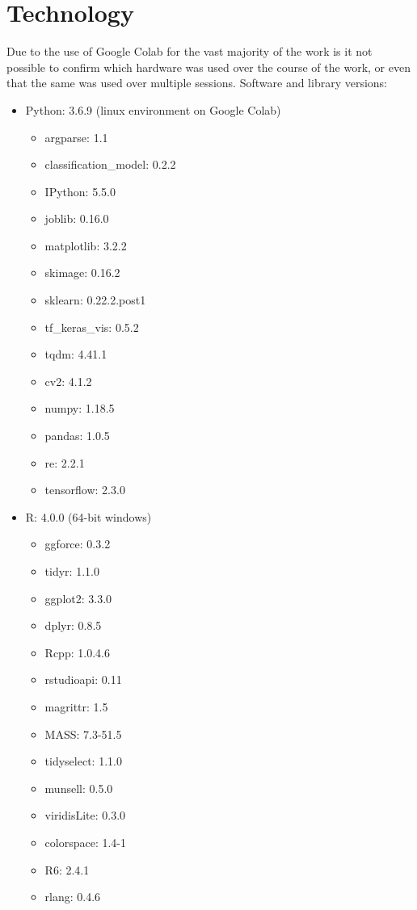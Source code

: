 \documentclass[12pt]{article}
\numberwithin{equation}{section}
\numberwithin{figure}{section}
\begin{document}
\section{Technology} 
\label{sec:Technology}
Due to the use of Google Colab for the vast majority of the work is it not possible to confirm which hardware was used over the course of the work, or even that the same was used over multiple sessions.
Software and library versions:
\begin{itemize}
	\item Python: 3.6.9 (linux environment on Google Colab)
	\begin{itemize}
		\item argparse: 1.1 
		\item classification\_model: 0.2.2 
		\item IPython: 5.5.0 
		\item joblib: 0.16.0 
		\item matplotlib: 3.2.2 
		\item skimage: 0.16.2 
		\item sklearn: 0.22.2.post1 
		\item tf\_keras\_vis: 0.5.2 
		\item tqdm: 4.41.1 
		\item cv2: 4.1.2 
		\item numpy: 1.18.5 
		\item pandas: 1.0.5 
		\item re: 2.2.1 
		\item tensorflow: 2.3.0
	\end{itemize}
	\item R: 4.0.0 (64-bit windows)
	\begin{itemize}
		\item ggforce: 0.3.2
		\item tidyr: 1.1.0
		\item ggplot2: 3.3.0
		\item dplyr: 0.8.5
		\item Rcpp: 1.0.4.6
		\item rstudioapi: 0.11
		\item magrittr: 1.5
		\item MASS: 7.3-51.5
		\item tidyselect: 1.1.0
		\item munsell: 0.5.0
		\item viridisLite: 0.3.0
		\item colorspace: 1.4-1
		\item R6: 2.4.1
		\item rlang: 0.4.6

\end{itemize}
\end{itemize}
\end{document}
